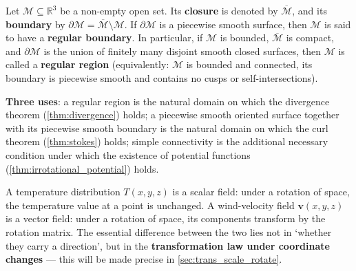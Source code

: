 \begin{definition}\label{def:field_domain}
Let $\mathcal{M} \subseteq \mathbb{R}^3$ be a non-empty open set. Its \textbf{closure} is denoted by $\overline{\mathcal{M}}$, and its \textbf{boundary} by $\partial \mathcal{M} = \overline{\mathcal{M}} \setminus \mathcal{M}$. If $\partial \mathcal{M}$ is a piecewise smooth surface, then $\mathcal{M}$ is said to have a \textbf{regular boundary}. In particular, if $\mathcal{M}$ is bounded, $\overline{\mathcal M}$ is compact, and $\partial \mathcal{M}$ is the union of finitely many disjoint smooth closed surfaces, then $\mathcal{M}$ is called a \textbf{regular region} (equivalently: $\mathcal{M}$ is bounded and connected, its boundary is piecewise smooth and contains no cusps or self-intersections).

\textbf{Three uses}: a regular region is the natural domain on which the divergence theorem (\cref{thm:divergence}) holds; a piecewise smooth oriented surface together with its piecewise smooth boundary is the natural domain on which the curl theorem (\cref{thm:stokes}) holds; simple connectivity is the additional necessary condition under which the existence of potential functions (\cref{thm:irrotational_potential}) holds.
\end{definition}

\begin{example}
A temperature distribution $T(x,y,z)$ is a scalar field: under a rotation of space, the temperature value at a point is unchanged. A wind-velocity field $\mathbf{v}(x,y,z)$ is a vector field: under a rotation of space, its components transform by the rotation matrix. The essential difference between the two lies not in `whether they carry a direction', but in the \textbf{transformation law under coordinate changes} --- this will be made precise in \cref{sec:trans_scale_rotate}.
\end{example}

